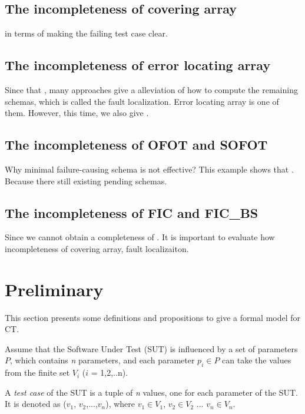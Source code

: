\subsection{The incompleteness of covering array}

in terms of making the failing test case clear.


\subsection{The incompleteness of error locating array}
Since that , many approaches give a alleviation of how to compute the remaining schemas, which is called the fault localization. Error locating array is one of them. However, this time, we also give .

\subsection{The incompleteness of OFOT and SOFOT}
Why minimal failure-causing schema is not effective?
This example shows that . Because there still existing pending schemas.

\subsection{The incompleteness of FIC and FIC\_BS}


Since we cannot obtain a completeness of . It is important to evaluate how incompleteness of covering array, fault localizaiton.

\section{Preliminary}\label{sec:back}
This section presents some definitions and propositions to give a formal model for CT.


Assume that the Software Under Test (SUT) is influenced by a set of parameters $P$, which contains \emph{n} parameters, and each parameter $p_{i} \in P$ can take the values from the finite set $V_{i}$ ($i$ = 1,2,..n).

\newtheorem{assumption}{Assumption}

\begin{definition}\label{de:testcase}
A \emph{test case} of the SUT is a tuple of \emph{n} values, one for each parameter of the SUT. It is denoted as  ($v_{1}$, $v_{2}$,...,$v_{n}$), where $v_{1}\in V_{1}$, $v_{2} \in V_{2}$ ... $v_{n} \in V_{n}$.
\end{definition}

